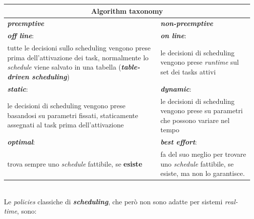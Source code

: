 \begin{tabular}{ |p{7.25cm}|p{7.25cm}| }
    \hline
    \multicolumn{2}{|c|}{\textbf{Algorithm taxonomy}} \\
    \hline
    \textbf{\textit{preemptive}} & \textbf{\textit{non-preemptive}} \\
    \hline
    \textbf{\textit{off line}}: & \textbf{\textit{on line}}: \\
    tutte le decisioni sullo scheduling vengono prese prima dell'attivazione dei task, normalmente lo \textit{schedule} viene salvato in una tabella (\textbf{\textit{table-driven scheduling}}) & le decisioni di scheduling vengono prese \textit{runtime} sul set dei tasks attivi \\ \hline
    \textbf{\textit{static}}: & \textbf{\textit{dynamic}}: \\
    le decisioni di scheduling vengono prese basandosi su parametri fissati, staticamente assegnati al task prima dell'attivazione & le decisioni di scheduling vengono prese su parametri che possono variare nel tempo \\ \hline
    \textbf{\textit{optimal}}: & \textbf{\textit{best effort}}: \\
    trova sempre uno \textit{schedule} fattibile, se \textbf{esiste} & fa del suo meglio per trovare uno \textit{schedule} fattibile, se esiste, ma non lo garantisce. \\ \hline
\end{tabular}
\\ \newline
Le \textit{policies} classiche di \textbf{\textit{scheduling}}, che però non sono adatte per sistemi \textit{real-time}, sono:

